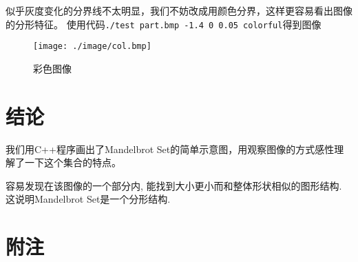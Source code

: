 \documentclass{article}
\begin{document}
似乎灰度变化的分界线不太明显，我们不妨改成用颜色分界，这样更容易看出图像的分形特征。
使用代码\verb|./test part.bmp -1.4 0 0.05 colorful|得到图像
\begin{figure}[H]
     \centering
     \texttt{[image: ./image/col.bmp]}
     \caption{彩色图像}
\end{figure}
\section{结论}
     我们用C++程序画出了Mandelbrot Set的简单示意图，用观察图像的方式感性理解了一下这个集合的特点。

     容易发现在该图像的一个部分内, 能找到大小更小而和整体形状相似的图形结构. 这说明Mandelbrot Set是一个分形结构.
\section{附注}


\end{document}
